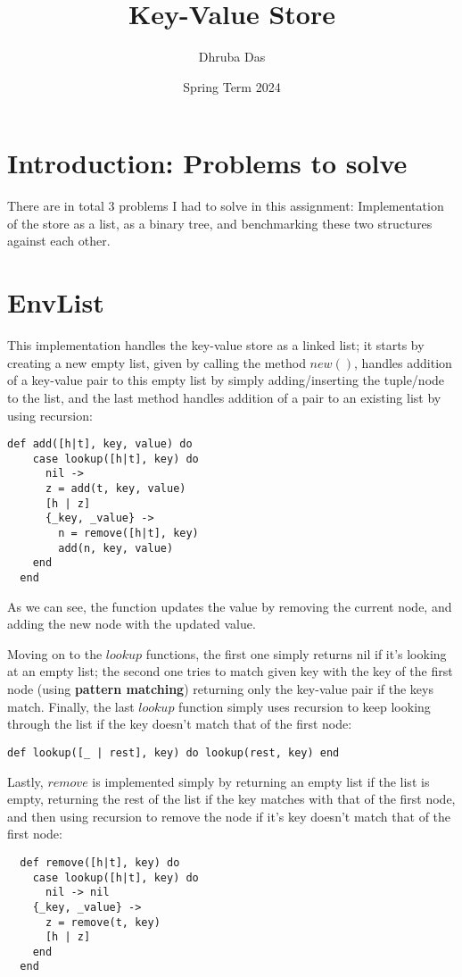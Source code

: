\documentclass[a4paper,11pt]{article}
\begin{document}
\title{
    \textbf{Key-Value Store}
}
\author{Dhruba Das}
\date{Spring Term 2024}

\maketitle

\section*{Introduction: Problems to solve}

There are in total 3 problems I had to solve in this assignment: Implementation of the store as a list, as a binary tree,  and benchmarking these two structures against each other.

\section*{EnvList}

This implementation handles the key-value store as a linked list; it starts by creating a new empty list, given by calling the method $new()$, handles addition of a key-value pair to this empty list by simply adding/inserting the tuple/node to the list, and the last method handles addition of a pair to an existing list by using recursion:

\begin{verbatim}
def add([h|t], key, value) do
    case lookup([h|t], key) do
      nil ->
      z = add(t, key, value)
      [h | z]
      {_key, _value} ->
        n = remove([h|t], key)
        add(n, key, value)
    end
  end
\end{verbatim}
As we can see, the function updates the value by removing the current node, and adding the new node with the updated value. 

Moving on to the $lookup$ functions, the first one simply returns nil if it's looking at an empty list; the second one tries to match given key with the key of the first node (using \textbf{pattern matching}) returning only the key-value pair if the keys match. Finally, the last $lookup$ function simply uses recursion to keep looking through the list if the key doesn't match that of the first node: 
\begin{verbatim}
def lookup([_ | rest], key) do lookup(rest, key) end
\end{verbatim}

Lastly, $remove$ is implemented simply by returning an empty list if the list is empty, returning the rest of the list if the key matches with that of the first node, and then using recursion to remove the node if it's key doesn't match that of the first node: 
\begin{verbatim}
  def remove([h|t], key) do
    case lookup([h|t], key) do
      nil -> nil
    {_key, _value} ->
      z = remove(t, key)
      [h | z]
    end
  end
\end{verbatim} 
\end{document}
